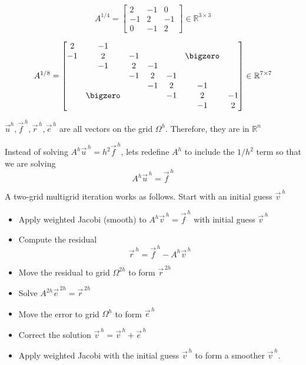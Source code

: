 \begin{equation*}
A^{1/4} = \begin{bmatrix}
  2 & -1 & 0 \\
  -1 & 2 & -1 \\
  0 &  -1 & 2
\end{bmatrix}
\in \mathbb{R}^{3 \times 3}
\end{equation*}

\begin{equation*}
A^{1/8} = \begin{bmatrix}
  2  & -1      &     &     &     &         &  \\
  -1 & 2       & -1  &     &     &\bigzero &  \\
     &  -1     & 2   &-1   &     &         &  \\
     &         &  -1 & 2   &-1   &         &  \\
     &         &     &  -1 & 2   &-1       &  \\
     &\bigzero &     &     &  -1 & 2       &-1\\
     &         &     &     &     &  -1     & 2
\end{bmatrix}
\in \mathbb{R}^{7 \times 7}
\end{equation*}

$\vec{u}^h, \vec{f}^{\,h}, \vec{r}^{\,h}, \vec{e}^{\,h}$ are all vectors on the grid $\Omega^h$.
Therefore, they are in $\mathbb{R}^{n}$

Instead of solving $A^h\vec{u}^{\,h}=h^2\vec{f}^{\,h}$, lets redefine $A^{h}$ to
include the $1/h^2$ term so that we are solving
\begin{equation*}
  A^h\vec{u}^{\,h} = \vec{f}^{\,h}
\end{equation*}

\pagebreak

A two-grid multigrid iteration works as follows. Start with an initial guess $\vec{v}^{\,h}$

\begin{itemize}
\item {}Apply weighted Jacobi (smooth) to $A^h\vec{v}^{\,h} =\vec{f}^{\,h}$ with
  initial guess $\vec{v}^{\,h}$ 
\item Compute the residual
  \begin{equation*}
\vec{r}^{\,h} = \vec{f}^{\,h} - A^h \vec{v}^{\,h}
  \end{equation*}
\item {}Move the residual to grid $\Omega^{2h}$ to form $\vec{r}^{\,2h}$
\item {}Solve $A^{2h}\vec{e}^{\,2h} = \vec{r}^{\,2h}$
\item {}Move the error to grid $\Omega^h$ to form $\vec{e}^{\,h}$
\item Correct the solution $\vec{v}^{\,h} = \vec{v}^{\,h} + \vec{e}^{\,h}$
\item {}Apply weighted Jacobi with the initial guess $\vec{v}^{\,h}$ to form a
  smoother $\vec{v}^{\,h}$.
\end{itemize}

